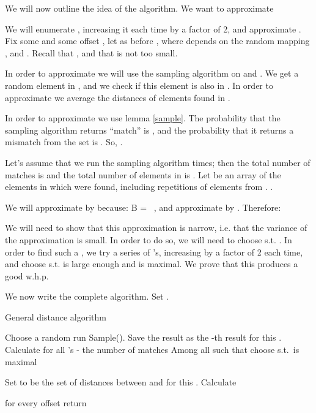 \documentclass[11pt]{article}
\newcommand{\be}{}
\newcommand{\envert}[1]{\left\lvert#1\right\rvert}
\let\abs=\envert
\newcommand{\bfE}{\textbf{E}}
\begin{document}
We will now outline the idea of the algorithm. We want to approximate

We will enumerate , increasing it each time by a factor of 2,
and approximate . Fix some  and
some offset , let as before  , where  depends on the random mapping ,
and . Recall that , and that  is not too
small.

In order to approximate  we will use the sampling
algorithm on  and . We get a random element in
, and we check if this element is also in . In order to
approximate  we average the distances of elements found
in .

In order to approximate  we use lemma
\ref{sample}. The probability that the sampling algorithm returns
``match'' is , and the probability that
it returns a mismatch from the set  is
. So,
.

Let's assume that we run the sampling algorithm  times; then the total
number of matches is  and the total number of
elements in  is . Let  be an array of the
elements in  which were found, including repetitions of elements
from . .

We will approximate  by  because:
\be \label {1eq}
\abs{B} = \frac{\bfE(m_1) (1-q)}{q \bfE(m_0)}\ ,
\ee
 and approximate  by . Therefore:


We will need to show that this approximation is narrow, i.e. that
the variance of the approximation is small. In order to do so, we
will need to choose  s.t. .
In order to find such a , we try a series of 's, increasing
by a factor of 2 each time, and choose  s.t.  is large
enough and  is maximal. We prove that this produces a good
 w.h.p.

We now write the complete algorithm. Set .


\begin{algorithm}[H]
\caption{General distance algorithm} \label{alg:general_distance}
\begin{algorithmic}[1]
    \FOR { ; ;  }\label{FOR1}
       \FOR{ ;  ;  }\label{FOR2}
        \FOR {; ; } \label{FOR3}
            \STATE Choose a random 
\STATE run Sample(). Save the result as the -th result for this .
        \ENDFOR
    \ENDFOR
            \STATE Calculate  for all 's - the number
            of matches
            \STATE Among all  such that  choose  s.t.\  is maximal

\STATE Set  to be the set of distances between  and  for this .
        \STATE Calculate
        


    \ENDFOR
  \ENDFOR
  \STATE for every offset  return 
\end{algorithmic}
\end{algorithm}
\end{document}
